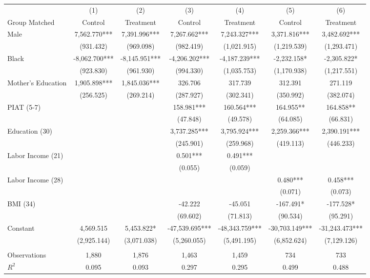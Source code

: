 \begin{tabular}{lcccccc} \toprule
 & (1) & (2) & (3) & (4) & (5) & (6) \\ 
Group Matched & Control & Treatment & Control & Treatment & Control & Treatment \\ \midrule
Male & 7,562.770*** & 7,391.996*** & 7,267.662*** & 7,243.327*** & 3,371.816*** & 3,482.692*** \\
 & (931.432) & (969.098) & (982.419) & (1,021.915) & (1,219.539) & (1,293.471) \\
Black & -8,062.700*** & -8,145.951*** & -4,206.202*** & -4,187.239*** & -2,232.158* & -2,305.822* \\
 & (923.830) & (961.930) & (994.330) & (1,035.753) & (1,170.938) & (1,217.551) \\
 Mother's Education & 1,905.898*** & 1,845.036*** & 326.706 & 317.739 & 312.391 & 271.119 \\
 & (256.525) & (269.214) & (287.927) & (302.341) & (350.992) & (382.074) \\
PIAT (5-7) &  &  & 158.981*** & 160.564*** & 164.955** & 164.858** \\
 &  &  & (47.848) & (49.578) & (64.085) & (66.831) \\
Education (30) &  &  & 3,737.285*** & 3,795.924*** & 2,259.366*** & 2,390.191*** \\
 &  &  & (245.901) & (259.968) & (419.113) & (446.233) \\
Labor Income (21) &  &  & 0.501*** & 0.491*** &  &  \\
 &  &  & (0.055) & (0.059) &  &  \\
Labor Income (28) &  &  &  &  & 0.480*** & 0.458*** \\
 &  &  &  &  & (0.071) & (0.073) \\
 BMI (34) &  &  & -42.222 & -45.051 & -167.491* & -177.528* \\
 &  &  & (69.602) & (71.813) & (90.534) & (95.291) \\
Constant & 4,569.515 & 5,453.822* & -47,539.695*** & -48,343.759*** & -30,703.149*** & -31,243.473*** \\
 & (2,925.144) & (3,071.038) & (5,260.055) & (5,491.195) & (6,852.624) & (7,129.126) \\ \\ \midrule
 Observations & 1,880 & 1,876 & 1,463 & 1,459 & 734 & 733 \\
$R^2$ & 0.095 & 0.093 & 0.297 & 0.295 & 0.499 & 0.488 \\ \bottomrule
\end{tabular}
